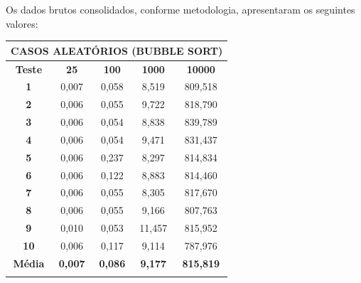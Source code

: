 \documentclass[a4paper, 12pt]{article}
\begin{document}
\tab{ }Os dados brutos consolidados, conforme metodologia, apresentaram os seguintes valores:
\vspace{0.2cm}

\begin{minipage}{1.0\textwidth}
 \begin{minipage}[c]{0.49\textwidth}
 \centering
 \begin{tabular}{ccccc}

                   \multicolumn{ 5}{c}{{\bf CASOS ALEATÓRIOS (BUBBLE SORT)}} \\
\hline
{\bf Teste} &  {\bf 25} & {\bf 100} & {\bf 1000} & {\bf 10000} \\
\hline
   {\bf 1} &      0,007 &      0,058 &      8,519 &    809,518 \\
\hline
   {\bf 2} &      0,006 &      0,055 &      9,722 &    818,790 \\
\hline
   {\bf 3} &      0,006 &      0,054 &      8,838 &    839,789 \\
\hline
   {\bf 4} &      0,006 &      0,054 &      9,471 &    831,437 \\
\hline
   {\bf 5} &      0,006 &      0,237 &      8,297 &    814,834 \\
\hline
   {\bf 6} &      0,006 &      0,122 &      8,883 &    814,460 \\
\hline
   {\bf 7} &      0,006 &      0,055 &      8,305 &    817,670 \\
\hline
   {\bf 8} &      0,006 &      0,055 &      9,166 &    807,763 \\
\hline
   {\bf 9} &      0,010 &      0,053 &     11,457 &    815,952 \\
\hline
  {\bf 10} &      0,006 &      0,117 &      9,114 &    787,976 \\
\hline
{\bf Média} & {\bf 0,007} & {\bf 0,086} & {\bf 9,177} & {\bf 815,819} \\
\hline
           &            &            &            &            \\
\end{tabular}
\end{minipage}
\hfill
\begin{minipage}[c]{0.49\textwidth}
\centering
{}
\end{minipage}
\end{minipage}
\end{document}
